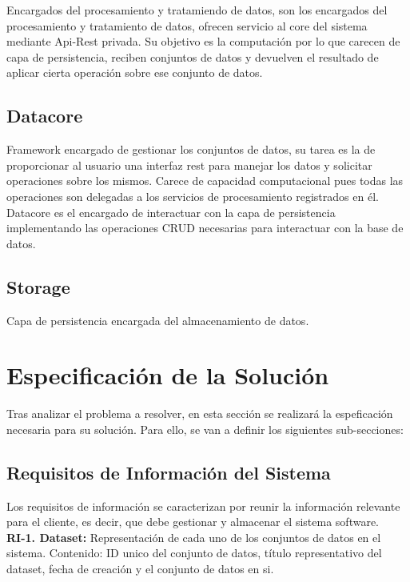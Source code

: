 \documentclass[a4paper,11pt]{book}
\begin{document}
Encargados del procesamiento y tratamiendo de datos, son los encargados del procesamiento y tratamiento de datos, ofrecen servicio al core del sistema mediante Api-Rest privada. Su objetivo es la computación por lo que carecen de capa de persistencia, reciben conjuntos de datos y devuelven el resultado de aplicar cierta operación sobre ese conjunto de datos. 

\subsection{Datacore}

Framework encargado de gestionar los conjuntos de datos, su tarea es la de proporcionar al usuario una interfaz rest para manejar los datos y solicitar operaciones sobre los mismos. Carece de capacidad computacional pues todas las operaciones son delegadas a los servicios de procesamiento registrados en él. Datacore es el encargado de interactuar con la capa de persistencia implementando las operaciones CRUD necesarias para interactuar con la base de datos.  

\subsection{Storage}

Capa de persistencia encargada del almacenamiento de datos.  

\section{Especificación de la Solución}

Tras analizar el problema a resolver, en esta sección se realizará la espeficación necesaria para su solución. Para ello, se van a definir los siguientes sub-secciones: 

\subsection{Requisitos de Información del Sistema}

Los requisitos de información se caracterizan por reunir la información relevante para el cliente, es decir, que debe gestionar y almacenar el sistema software.\\

\textbf{RI-1. Dataset:} Representación de cada uno de los conjuntos de datos en el sistema. 
Contenido: ID unico del conjunto de datos, título representativo del dataset, fecha de creación y el conjunto de datos en si. \\
\end{document}
